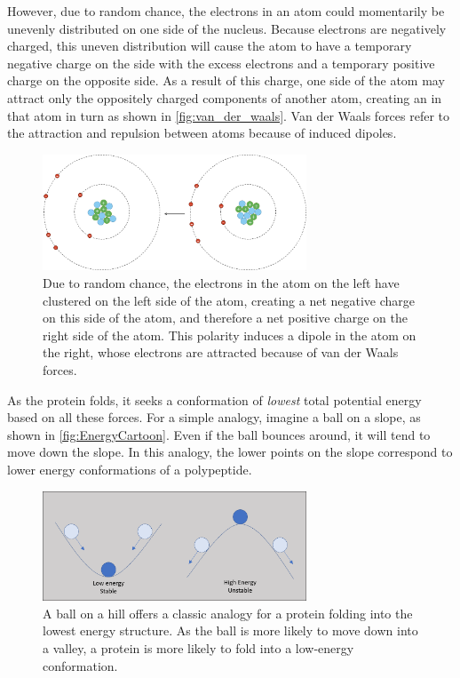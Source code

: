 {However, due to random chance, the electrons in an atom could momentarily be unevenly distributed on one side of the nucleus. Because electrons are negatively charged, this uneven distribution will cause the atom to have a temporary negative charge on the side with the excess electrons and a temporary positive charge on the opposite side. As a result of this charge, one side of the atom may attract only the oppositely charged components of another atom, creating an  in that atom in turn as shown in \autoref{fig:van_der_waals}. Van der Waals forces refer to the attraction and repulsion between atoms because of induced dipoles.

\begin{figure}[h]
	\centering
	\mySfFamily
	\includegraphics[width = 0.7\textwidth]{../images/van_der_waals.png}
	\caption{Due to random chance, the electrons in the atom on the left have clustered on the left side of the atom, creating a net negative charge on this side of the atom, and therefore a net positive charge on the right side of the atom. This polarity induces a dipole in the atom on the right, whose electrons are attracted because of van der Waals forces.}
	\label{fig:van_der_waals}
\end{figure}

As the protein folds, it seeks a conformation of \textit{lowest} total potential energy based on all these forces. For a simple analogy, imagine a ball on a slope, as shown in \autoref{fig:EnergyCartoon}. Even if the ball bounces around, it will tend to move down the slope. In this analogy, the lower points on the slope correspond to lower energy conformations of a polypeptide.

\begin{figure}[h]
	\centering
	\mySfFamily
	\includegraphics[width = 0.7\textwidth]{../images/EnergyCartoon.png}
	\caption{A ball on a hill offers a classic analogy for a protein folding into the lowest energy structure. As the ball is more likely to move down into a valley, a protein is more likely to fold into a low-energy conformation.}
	\label{fig:EnergyCartoon}
\end{figure}

}
